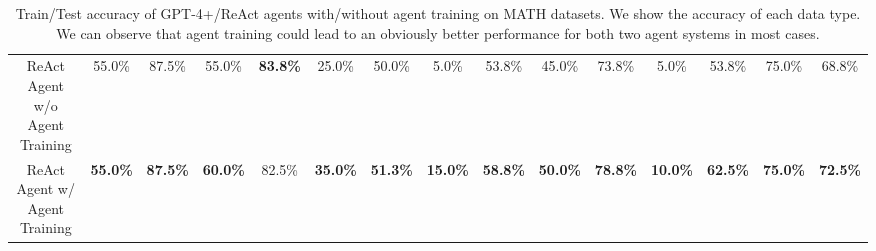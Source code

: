 \documentclass{article}
\theoremstyle{plain}
\theoremstyle{definition}
\theoremstyle{remark}
\begin{document}
\begin{table}[t]
{\begin{tabular}{ccccccccccccccc}
ReAct Agent w/o Agent Training                           &     55.0\%             &    87.5\%            &     55.0\%           &  \textbf{83.8\% }           &    25.0\%               &50.0\%                 &   5.0\%             &  53.8\%             &  45.0\%                &      73.8\%         &      5.0\%            &  53.8\%               &  75.0\%               & 68.8\%              \\
\rowcolor[gray]{0.9} ReAct Agent w/ Agent Training                            & \textbf{55.0\%}                & \textbf{87.5\%}             &      \textbf{60.0\%}         &  82.5\%           &    \textbf{35.0\%}              &    \textbf{51.3\%}            &         \textbf{15.0\%}      &   \textbf{58.8\%}           &        \textbf{50.0\%}         &     \textbf{78.8\%}          &          \textbf{10.0\%}       &        \textbf{62.5\%}        &     \textbf{75.0\%}           & \textbf{72.5\%}              \\
 \bottomrule[1.5pt]
\end{tabular}
}
\vskip -0.09in
\caption{Train/Test accuracy of GPT-4+/ReAct agents with/without agent training on MATH datasets. We show the accuracy of each data type. We can observe that agent training could lead to an obviously better performance for both two agent systems in most cases. 
}
\label{tab:math_main}
\end{table}



\begin{table}[!t]
\centering
\setlength{\tabcolsep}{23.1pt}
\vskip -0.09in
\caption{Train/Test accuracy of GPT-4+/ReAct agents with/without agent training on the GAIA and TabMWP datasets. 
We can observe that agent training can lead to greater performance for both GPT-4+ and ReAct agents on both two datasets.}
\label{tab:gaiatab_main}
\end{table}
\end{document}
